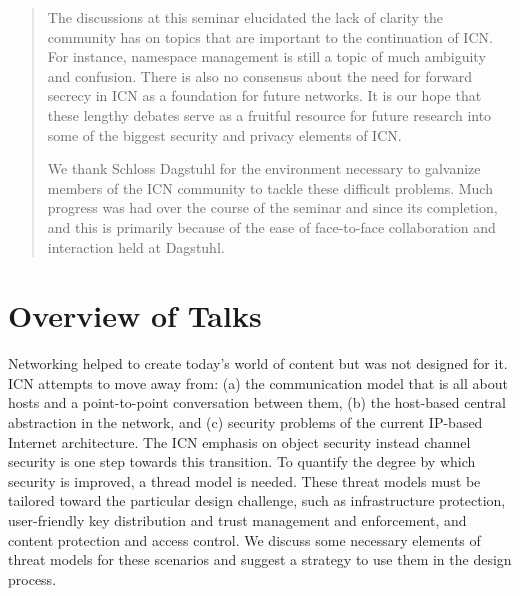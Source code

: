 \documentclass[a4paper,UKenglish]{dagrep}
\begin{document}
\begin{abstract}
The discussions at this seminar elucidated the lack of clarity the community has on topics that are important to the continuation of ICN. For instance, namespace management is still a topic of much ambiguity and confusion. There is also no consensus about the need for forward secrecy in ICN as a foundation for future networks. It is our hope that these lengthy debates serve as a fruitful resource for future research into some of the biggest security and privacy elements of ICN.

We thank Schloss Dagstuhl for the environment necessary to galvanize members of the ICN community to tackle these difficult problems. Much progress was had over the course of the seminar and since its completion, and this is primarily because of the ease of face-to-face collaboration and interaction held at Dagstuhl.
\end{abstract}

\tableofcontents


\section{Overview of Talks}

\license

Networking helped to create today's world of content but was not designed for it. ICN attempts to move away from: (a) the communication model that is all about hosts and a point-to-point conversation between them, (b) the host-based central abstraction in the network, and (c) security problems of the current IP-based Internet architecture. The ICN emphasis on object security instead channel security is one step towards this transition. To quantify the degree by which security is improved, a thread model is needed. These threat models must be tailored toward the particular design challenge, such as infrastructure protection, user-friendly key distribution and trust management and enforcement, and content protection and access control. We discuss some necessary elements of threat models for these scenarios and suggest a strategy to use them in the design process.

\license
\end{document}
